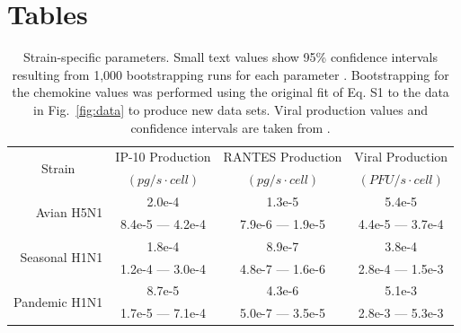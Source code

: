 \documentclass[preprint,10pt,numbers]{elsarticle}
\begin{document}
%

\pagebreak

\section*{Tables}



\begin{table}[!ht]
\centering
\begin{tabular}{ | r | c | c | c | }
  \hline                        
  \multicolumn{1}{|c|}{\multirow{2}{*}{Strain}} & IP-10 Production & RANTES Production & Viral Production \\
   & \footnotesize{$(pg/s\cdot cell)$}  & \footnotesize{$(pg/s\cdot cell)$} &  \footnotesize{$(PFU/s\cdot cell)$} \\
  \hline
  \multirow{2}{*}{Avian H5N1} & 2.0e-4 &  1.3e-5 & 5.4e-5 \\
   &  \footnotesize{8.4e-5 --- 4.2e-4} & \footnotesize{7.9e-6 --- 1.9e-5} & \footnotesize{4.4e-5 --- 3.7e-4}\\ 
   \hline
  \multirow{2}{*}{Seasonal H1N1} & 1.8e-4 &  8.9e-7 & 3.8e-4 \\
   & \footnotesize{1.2e-4 --- 3.0e-4} & \footnotesize{4.8e-7 --- 1.6e-6} & \footnotesize{2.8e-4 --- 1.5e-3}\\
   \hline
  \multirow{2}{*}{Pandemic H1N1} & 8.7e-5 &  4.3e-6 & 5.1e-3 \\
   & \footnotesize{1.7e-5 --- 7.1e-4} & \footnotesize{5.0e-7 --- 3.5e-5} & \footnotesize{2.8e-3 --- 5.3e-3} \\
  \hline
\end{tabular}
\caption{Strain-specific parameters.  Small text values show 95\% confidence intervals resulting from 1,000 bootstrapping runs for each parameter \citep{Wu1986}.  Bootstrapping for the chemokine values was performed using the original fit of Eq. S1 to the data in Fig.~\ref{fig:data} to produce new data sets.  Viral production values and confidence intervals are taken from \citep{Mitchell2011}.}
\label{tab:strains}
\end{table}
\end{document}
